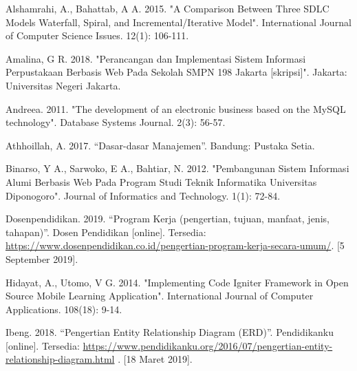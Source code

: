 \documentclass{jtetiskripsi}
\begin{document}
\begin{thebibliography}{99}
	
	
	 Alshamrahi, A.,  Bahattab, A A. 2015. "A Comparison Between Three SDLC Models Waterfall, Spiral, and Incremental/Iterative Model". International Journal of Computer Science Issues. 12(1): 106-111. 
	
	 Amalina, G R. 2018. "Perancangan dan Implementasi Sistem Informasi Perpustakaan Berbasis Web Pada Sekolah SMPN 198 Jakarta [skripsi]". Jakarta: Universitas Negeri Jakarta.
	
	 Andreea. 2011. "The development of an electronic business based on the MySQL technology". Database Systems Journal. 2(3): 56-57.
	
	 Athhoillah, A. 2017. “Dasar-dasar Manajemen”. Bandung: Pustaka Setia.
	
	 Binarso, Y A., Sarwoko, E A., Bahtiar, N. 2012. "Pembangunan Sistem Informasi Alumi Berbasis Web Pada Program Studi Teknik Informatika Universitas Diponogoro". Journal of Informatics and Technology. 1(1): 72-84.
	
	 Dosenpendidikan. 2019. “Program Kerja (pengertian, tujuan, manfaat, jenis, tahapan)”. Dosen Pendidikan [online]. Tersedia: \url{https://www.dosenpendidikan.co.id/pengertian-program-kerja-secara-umum/}. [5 September 2019].
	
	
	 Hidayat, A., Utomo, V G. 2014.  "Implementing Code Igniter Framework in Open Source Mobile Learning Application". International Journal of Computer Applications. 108(18): 9-14.
	
	 Ibeng. 2018. “Pengertian Entity Relationship Diagram (ERD)”. Pendidikanku [online]. Tersedia: \url{https://www.pendidikanku.org/2016/07/pengertian-entity-relationship-diagram.html} . [18 Maret 2019].
	
	

\end{thebibliography}
\end{document}
